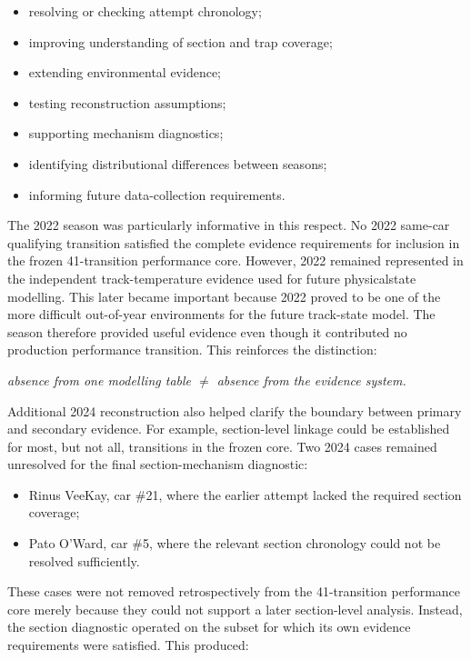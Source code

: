 \begin{itemize}
\item resolving or checking attempt chronology;
\item improving understanding of section and trap coverage;
\item extending environmental evidence;
\item testing reconstruction assumptions;
\item supporting mechanism diagnostics;
\item identifying distributional differences between seasons;
\item informing future data-collection requirements.
\end{itemize}

The 2022 season was particularly informative in this respect. No 2022 same-car qualifying transition satisfied the complete evidence requirements for inclusion in the frozen 41-transition performance core. However, 2022 remained represented in the independent track-temperature evidence used for future physicalstate modelling. This later became important because 2022 proved to be one of the more difficult out-of-year environments for the future track-state model. The season therefore provided useful evidence even though it contributed no production performance transition. This reinforces the distinction:

\begin{center}\textit{absence from one modelling table \ensuremath{\neq} absence from the evidence system.}\end{center}

Additional 2024 reconstruction also helped clarify the boundary between primary and secondary evidence. For example, section-level linkage could be established for most, but not all, transitions in the frozen core. Two 2024 cases remained unresolved for the final section-mechanism diagnostic:

\begin{itemize}
\item Rinus VeeKay, car \#21, where the earlier attempt lacked the required section coverage;
\item Pato O'Ward, car \#5, where the relevant section chronology could not be resolved sufficiently.
\end{itemize}

These cases were not removed retrospectively from the 41-transition performance core merely because they could not support a later section-level analysis. Instead, the section diagnostic operated on the subset for which its own evidence requirements were satisfied. This produced:

